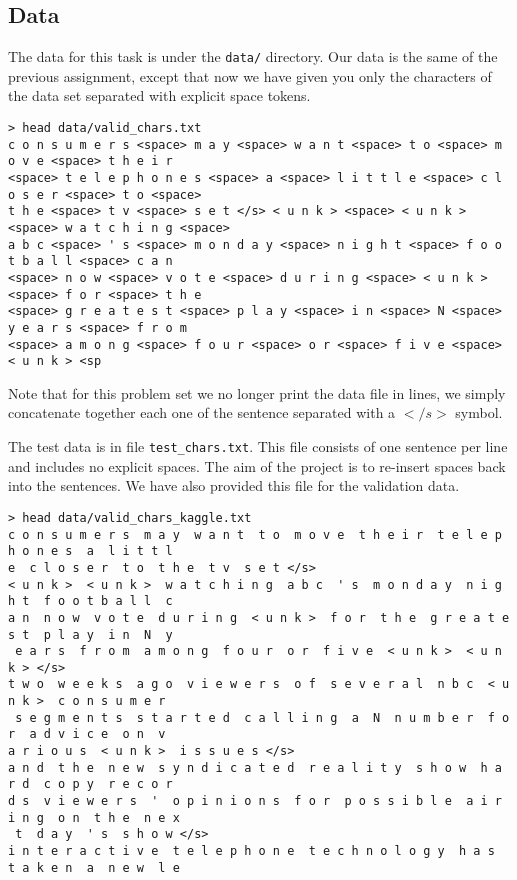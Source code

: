 \documentclass[11pt]{article}
\begin{document}
\subsection{Data}

The data for this task is under the \texttt{data/} directory. 
Our data is the same of the previous assignment, except that 
now we have given you only the characters of the data set 
separated with explicit space tokens. 


\lstset{ basicstyle=\ttfamily, breaklines=true}

\begin{lstlisting}
> head data/valid_chars.txt 
c o n s u m e r s <space> m a y <space> w a n t <space> t o <space> m o v e <space> t h e i r
<space> t e l e p h o n e s <space> a <space> l i t t l e <space> c l o s e r <space> t o <space> 
t h e <space> t v <space> s e t </s> < u n k > <space> < u n k > <space> w a t c h i n g <space> 
a b c <space> ' s <space> m o n d a y <space> n i g h t <space> f o o t b a l l <space> c a n 
<space> n o w <space> v o t e <space> d u r i n g <space> < u n k > <space> f o r <space> t h e 
<space> g r e a t e s t <space> p l a y <space> i n <space> N <space> y e a r s <space> f r o m 
<space> a m o n g <space> f o u r <space> o r <space> f i v e <space> < u n k > <sp
\end{lstlisting}

Note that for this problem set we no longer print the data file in lines, we 
simply concatenate together each one of the sentence separated with a $</s>$
symbol. 


The test data is in file \texttt{test\_chars.txt}. This file consists 
of one sentence per line and includes no explicit spaces. The aim of 
the project is to re-insert spaces back into the sentences. We have 
also provided this file for the validation data.

\begin{lstlisting}
> head data/valid_chars_kaggle.txt 
c o n s u m e r s  m a y  w a n t  t o  m o v e  t h e i r  t e l e p h o n e s  a  l i t t l 
e  c l o s e r  t o  t h e  t v  s e t </s>                                                  
< u n k >  < u n k >  w a t c h i n g  a b c  ' s  m o n d a y  n i g h t  f o o t b a l l  c 
a n  n o w  v o t e  d u r i n g  < u n k >  f o r  t h e  g r e a t e s t  p l a y  i n  N  y
 e a r s  f r o m  a m o n g  f o u r  o r  f i v e  < u n k >  < u n k > </s>               
t w o  w e e k s  a g o  v i e w e r s  o f  s e v e r a l  n b c  < u n k >  c o n s u m e r 
 s e g m e n t s  s t a r t e d  c a l l i n g  a  N  n u m b e r  f o r  a d v i c e  o n  v 
a r i o u s  < u n k >  i s s u e s </s>                                                     
a n d  t h e  n e w  s y n d i c a t e d  r e a l i t y  s h o w  h a r d  c o p y  r e c o r 
d s  v i e w e r s  '  o p i n i o n s  f o r  p o s s i b l e  a i r i n g  o n  t h e  n e x
 t  d a y  ' s  s h o w </s>                                                                 
i n t e r a c t i v e  t e l e p h o n e  t e c h n o l o g y  h a s  t a k e n  a  n e w  l e
\end{lstlisting}
\end{document}

